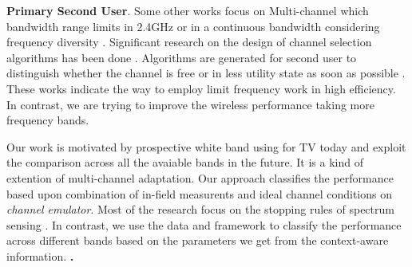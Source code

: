 \textbf{Primary Second User}. Some other works focus on Multi-channel which bandwidth range limits in 2.4GHz \cite{MOAR} or in a continuous bandwidth considering frequency diversity \cite{rahul2009frequency}. 
Significant research on the design of channel selection algorithms has been done \cite{radunovic2011dynamic,raniwala2005architecture}. Algorithms are generated for second user to distinguish whether the channel is free or in less utility state as soon as possible \cite{cordeiro2007c}. These works indicate the way to employ limit frequency work in high efficiency. In contrast, we are trying to improve the wireless performance taking more frequency bands.

Our work is motivated by prospective white band using for TV today and exploit the comparison across all the avaiable bands in the future. It is a kind of extention of multi-channel adaptation. Our approach classifies the performance based upon combination of in-field measurents and ideal channel conditions on \emph{channel emulator}. Most of the research focus on the stopping rules of spectrum sensing \cite{sabharwal2007opportunistic, OAR}. In contrast, we use the data and framework to classify the performance across different bands based on the parameters we get from the context-aware information.
{\bf .} 

